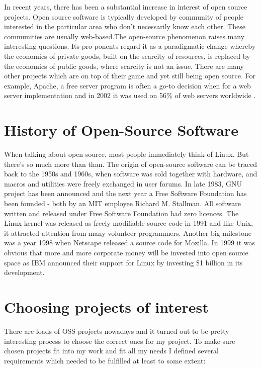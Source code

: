 In recent years, there has been a substantial increase in interest of open source projects. Open source software is typically developed by community of people interested in the particular area who don't necessarily know each other. These communities are usually web-based.The open-source phenomenon raises many interesting questions. Its pro-ponents regard it as a paradigmatic change whereby the economics of private goods, built on the scarcity of resources, is replaced by the economics of public goods, where scarcity is not an issue. \cite{alexander2002working} There are many other projects which are on top of their game and yet still being open source. For example, Apache, a free server program is often a go-to decision when for a web server implementation and in 2002 it was used on 56\% of web servers worldwide \cite{lerner2001open}.

\section{History of Open-Source Software}
When talking about open source, most people immediately think of Linux. But there's so much more than than. The origin of open-source software can be traced back to the 1950s and 1960s, when software was sold together with hardware, and macros and utilities were freely exchanged in user forums. \cite{alexander2002working} In late 1983, GNU project has been announced and the next year a Free Software Foundation has been founded - both by an MIT employee Richard M. Stallman. All software written and released under Free Software Foundation had zero licences. The Linux kernel was released as freely modifiable source code in 1991 and like Unix, it attracted attention from many volunteer programmers. Another big milestone was a year 1998 when Netscape released a source code for Mozilla. In 1999 it was obvious that more and more corporate money will be invested into open source space as IBM announced their support for Linux by investing \$1 billion in its development.

\section{Choosing projects of interest}
There are loads of OSS projects nowadays and it turned out to be pretty interesting process to choose the correct ones for my project. To make sure chosen projects fit into my work and fit  all my needs I defined several requirements which needed to be fulfilled at least to some extent:

